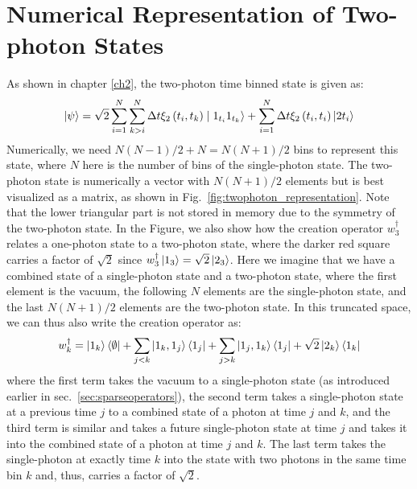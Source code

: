 \section{Numerical Representation of Two-photon States \label{sec:twophoton_numerical}}
As shown in chapter \ref{ch2}, the two-photon time binned state is given as:
\begin{equation}
    \ket{\psi} = \sqrt{2} \sum_{i=1}^N \sum_{k > i}^N \Delta t \xi_2\left (t_i,t_k\right ) \mid 1_{t_i} 1_{t_k}\rangle + \sum_{i=1}^N \Delta t \xi_2\left (t_i,t_i\right )\left|2 t_i\right\rangle
\end{equation}
Numerically, we need $N(N-1)/2 + N = N(N+1)/2$ bins to represent this state, where $N$ here is the number of bins of the single-photon state. The two-photon state is numerically a vector with $N(N+1)/2$ elements but is best visualized as a matrix, as shown in Fig.\ \ref{fig:twophoton_representation}. Note that the lower triangular part is not stored in memory due to the symmetry of the two-photon state. In the Figure, we also show how the creation operator $w_3^\dagger$ relates a one-photon state to a two-photon state, where the darker red square carries a factor of $\sqrt{2}$ since $w_3^\dagger \ket{1_3} = \sqrt{2}\ket{2_3}$. Here we imagine that we have a combined state of a single-photon state and a two-photon state, where the first element is the vacuum, the following $N$ elements are the single-photon state, and the last $N(N+1)/2$ elements are the two-photon state. In this truncated space, we can thus also write the creation operator as:
\begin{equation}
    w_k^\dagger = \ket{1_k} \bra{\emptyset} + \sum_{j < k} \ket{1_k,1_j} \bra{1_j} + \sum_{j > k} \ket{1_j,1_k} \bra{1_j} + \sqrt{2} \ket{2_k} \bra{1_k} 
\end{equation}
where the first term takes the vacuum to a single-photon state (as introduced earlier in sec.~\ref{sec:sparseoperators}), the second term takes a single-photon state at a previous time $j$ to a combined state of a photon at time $j$ and $k$, and the third term is similar and takes a future single-photon state at time $j$ and takes it into the combined state of a photon at time $j$ and $k$. The last term takes the single-photon at exactly time $k$ into the state with two photons in the same time bin $k$ and, thus, carries a factor of $\sqrt{2}$. 

